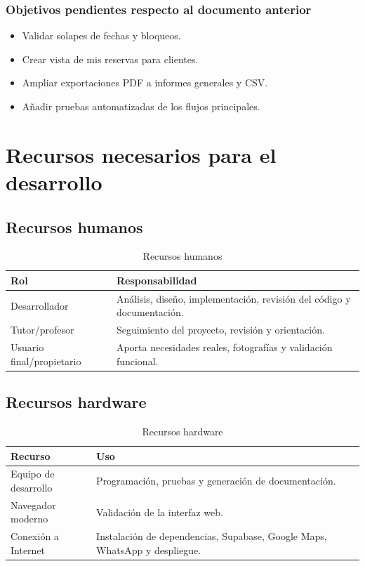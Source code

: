 \documentclass[11pt,a4paper]{article}
\begin{document}
\subsubsection*{Objetivos pendientes respecto al documento anterior}
\begin{itemize}[leftmargin=1.4cm]
  \item Validar solapes de fechas y bloqueos.
  \item Crear vista de mis reservas para clientes.
  \item Ampliar exportaciones PDF a informes generales y CSV.
  \item Añadir pruebas automatizadas de los flujos principales.
\end{itemize}

\section{Recursos necesarios para el desarrollo}

\subsection{Recursos humanos}
\begin{table}[H]
\centering
\begin{tabularx}{\textwidth}{|p{3.5cm}|X|}
\hline
\textbf{Rol} & \textbf{Responsabilidad} \\
\hline
Desarrollador & Análisis, diseño, implementación, revisión del código y documentación. \\
\hline
Tutor/profesor & Seguimiento del proyecto, revisión y orientación. \\
\hline
Usuario final/propietario & Aporta necesidades reales, fotografías y validación funcional. \\
\hline
\end{tabularx}
\caption{Recursos humanos}
\end{table}

\subsection{Recursos hardware}
\begin{table}[H]
\centering
\begin{tabularx}{\textwidth}{|p{4.2cm}|X|}
\hline
\textbf{Recurso} & \textbf{Uso} \\
\hline
Equipo de desarrollo & Programación, pruebas y generación de documentación. \\
\hline
Navegador moderno & Validación de la interfaz web. \\
\hline
Conexión a Internet & Instalación de dependencias, Supabase, Google Maps, WhatsApp y despliegue. \\
\hline
\end{tabularx}
\caption{Recursos hardware}
\end{table}
\end{document}
